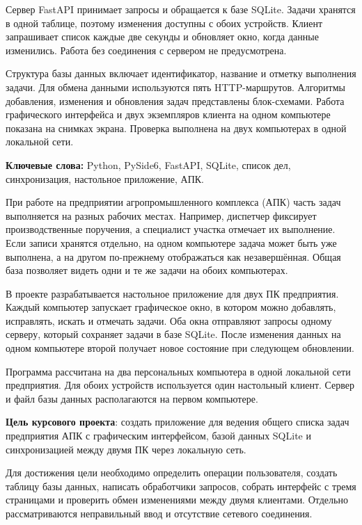 \documentclass[14pt,a4paper]{extreport}
\begin{document}
Сервер FastAPI принимает запросы и обращается к базе SQLite. Задачи хранятся в одной таблице, поэтому изменения доступны с обоих устройств. Клиент запрашивает список каждые две секунды и обновляет окно, когда данные изменились. Работа без соединения с сервером не предусмотрена.

Структура базы данных включает идентификатор, название и отметку выполнения задачи. Для обмена данными используются пять HTTP-маршрутов. Алгоритмы добавления, изменения и обновления задач представлены блок-схемами. Работа графического интерфейса и двух экземпляров клиента на одном компьютере показана на снимках экрана. Проверка выполнена на двух компьютерах в одной локальной сети.

\noindent\textbf{Ключевые слова:} Python, PySide6, FastAPI, SQLite, список дел, синхронизация, настольное приложение, АПК.
\clearpage

\tableofcontents
\clearpage

\intro
При работе на предприятии агропромышленного комплекса (АПК) часть задач выполняется на разных рабочих местах. Например, диспетчер фиксирует производственные поручения, а специалист участка отмечает их выполнение. Если записи хранятся отдельно, на одном компьютере задача может быть уже выполнена, а на другом по-прежнему отображаться как незавершённая. Общая база позволяет видеть одни и те же задачи на обоих компьютерах.

В проекте разрабатывается настольное приложение для двух ПК предприятия. Каждый компьютер запускает графическое окно, в котором можно добавлять, исправлять, искать и отмечать задачи. Оба окна отправляют запросы одному серверу, который сохраняет задачи в базе SQLite. После изменения данных на одном компьютере второй получает новое состояние при следующем обновлении.

Программа рассчитана на два персональных компьютера в одной локальной сети предприятия. Для обоих устройств используется один настольный клиент. Сервер и файл базы данных располагаются на первом компьютере.

\textbf{Цель курсового проекта}: создать приложение для ведения общего списка задач предприятия АПК с графическим интерфейсом, базой данных SQLite и синхронизацией между двумя ПК через локальную сеть.

Для достижения цели необходимо определить операции пользователя, создать таблицу базы данных, написать обработчики запросов, собрать интерфейс с тремя страницами и проверить обмен изменениями между двумя клиентами. Отдельно рассматриваются неправильный ввод и отсутствие сетевого соединения.
\end{document}
